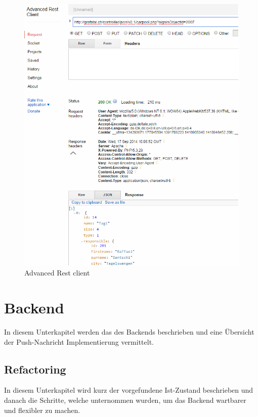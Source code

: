 \begin{figure}[h]
\centering
\includegraphics[scale=0.5]{images/advanced_rest_client.png}
\caption{Advanced Rest client}
\label{fig:advanced_rest_client}
\end{figure}

\FloatBarrier


\clearpage
\section{Backend}\label{impl_backend}
In diesem Unterkapitel werden das  des Backends beschrieben und eine Übersicht der Push-Nachricht Implementierung vermittelt.

\subsection{Refactoring}
In diesem Unterkapitel wird kurz der vorgefundene Ist-Zustand beschrieben und danach die Schritte, welche unternommen wurden, um das Backend wartbarer und flexibler zu machen.

